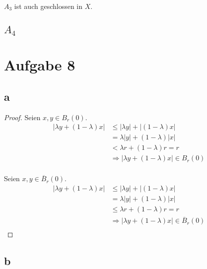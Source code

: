 \documentclass[10pt,a4paper]{article}
\begin{document}
$A_{3}$ ist auch geschlossen in $X$.

\subsection*{$A_{4}$}

\section*{Aufgabe 8}

\subsection*{a}

\begin{proof}
Seien $x, y \in B_{r}(0)$.
\begin{align}
|\lambda y + (1 - \lambda)x| & \le |\lambda y| + |(1 - \lambda) x|\\
& = \lambda |y| + (1 - \lambda) |x|\\
& < \lambda r + (1 - \lambda) r = r\\
& \Rightarrow |\lambda y + (1 - \lambda)x| \in B_{r}(0)\\
\end{align}

Seien $x, y \in \overline{B}_{r}(0)$.
\begin{align}
|\lambda y + (1 - \lambda)x| & \le |\lambda y| + |(1 - \lambda) x|\\
& = \lambda |y| + (1 - \lambda) |x|\\
& \le \lambda r + (1 - \lambda) r = r\\
& \Rightarrow |\lambda y + (1 - \lambda)x| \in \overline{B}_{r}(0)\\
\end{align}
\end{proof}

\subsection*{b}
\end{document}
